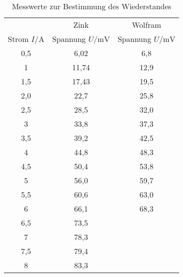 \begin{table}
  \centering
  \caption{Messwerte zur Bestimmung des Wiederstandes }
  \label{tab:R}
  \begin{tabular}{c c c}
    \toprule
                       &     Zink                        & Wolfram\\
Strom $I/\si{\ampere}$ & Spannung $U/\si{\milli\volt}$  & Spannung $U/\si{\milli\volt}$ \\
    \midrule
    0,5   &  6,02  &  6,8\\
    1     &  11,74 &  12,9\\
    1,5   &  17,43 &  19,5\\
    2,0   &  22,7  &  25,8\\
    2,5   &  28,5  &  32,0\\
    3     &  33,8  &  37,3\\
    3,5   &  39,2  &  42,5\\
    4     &  44,8  &  48,3\\
    4,5   &  50,4  &  53,8\\
    5     &  56,0  &  59,7\\
    5,5   &  60,6  &  63,0\\
    6     &  66,1  &  68,3\\
    6,5   &  73,5  &\\
    7     &  78,3  &\\
    7,5   &  79,4  &\\
    8     &  83,3  &\\
   \bottomrule
  \end{tabular}
\end{table}


